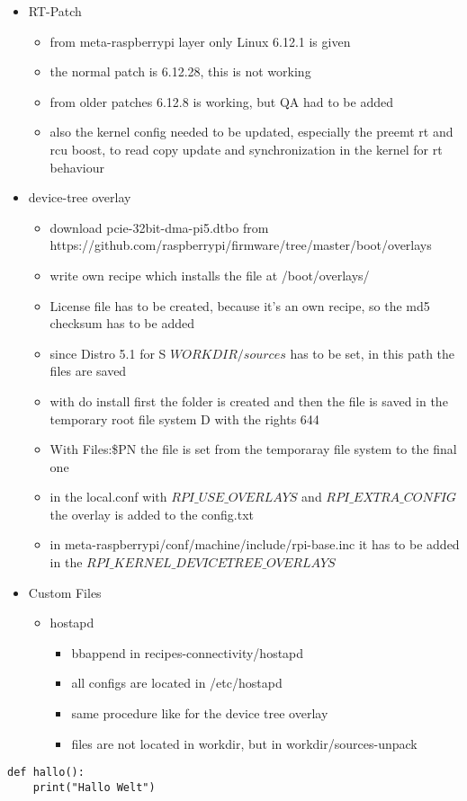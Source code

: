 \begin{itemize}
\begin{itemize}
    \end{itemize}
    \item RT-Patch \begin{itemize}
        \item from meta-raspberrypi layer only Linux 6.12.1 is given
        \item the normal patch is 6.12.28, this is not working
        \item from older patches 6.12.8 is working, but QA had to be added
        \item also the kernel config needed to be updated, especially the preemt rt and rcu boost, to read copy update and synchronization in the kernel for rt behaviour
    \end{itemize}
    \item device-tree overlay \begin{itemize}
        \item download pcie-32bit-dma-pi5.dtbo from https://github.com/raspberrypi/firmware/tree/master/boot/overlays
        \item write own recipe which installs the file at /boot/overlays/
        \item License file has to be created, because it's an own recipe, so the md5 checksum has to be added
        \item since Distro 5.1 for S ${WORKDIR}/sources$ has to be set, in this path the files are saved
        \item with do install first the folder is created and then the file is saved in the temporary root file system D with the rights 644
        \item With Files:\${PN} the file is set from the temporaray file system to the final one 
        \item in the local.conf with $RPI\_USE\_OVERLAYS$ and $RPI\_EXTRA\_CONFIG$ the overlay is added to the config.txt
        \item in meta-raspberrypi/conf/machine/include/rpi-base.inc it has to be added in the $RPI\_KERNEL\_DEVICETREE\_OVERLAYS$ 
    \end{itemize}
    \item Custom Files \begin{itemize}
        \item hostapd \begin{itemize}
            \item bbappend in recipes-connectivity/hostapd
            \item all configs are located in /etc/hostapd
            \item same procedure like for the device tree overlay
            \item files are not located in workdir, but in workdir/sources-unpack
        \end{itemize}
    \end{itemize}  
\end{itemize}

\begin{verbatim}
def hallo():
    print("Hallo Welt")
\end{verbatim}
